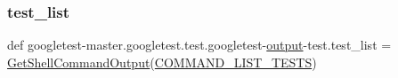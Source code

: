 \subsubsection{\texorpdfstring{test\_list}{test\_list}}
{\footnotesize\ttfamily def googletest-\/master.\+googletest.\+test.\+googletest-\/\mbox{\hyperlink{namespacegoogletest-master_1_1googletest_1_1test_1_1googletest-output-test_a734f0a5bd94ba038f4350763c6977129}{output}}-\/test.\+test\+\_\+list = \mbox{\hyperlink{namespacegoogletest-master_1_1googletest_1_1test_1_1googletest-output-test_aa982dca3285605db207fb98817d0c456}{Get\+Shell\+Command\+Output}}(\mbox{\hyperlink{namespacegoogletest-master_1_1googletest_1_1test_1_1googletest-output-test_a75e033931a0e3f81ecd77fbbcee0ed50}{C\+O\+M\+M\+A\+N\+D\+\_\+\+L\+I\+S\+T\+\_\+\+T\+E\+S\+TS}})}

